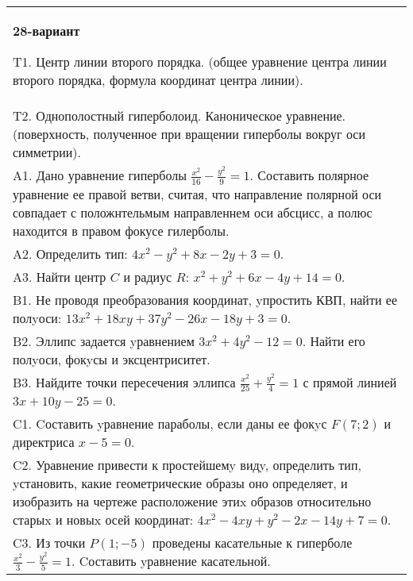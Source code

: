\documentclass{article}
\begin{document}
\begin{tabular}{m{17cm}}
\textbf{28-вариант}
\newline

T1. Центр линии второго порядка. (общее уравнение центра линии второго порядка, формула координат центра линии).\\

T2. Однополостный гиперболоид. Каноническое уравнение. (поверхность, полученное при вращении гиперболы вокруг оси симметрии).\\

A1. Дано уравнение гиперболы $\frac{x^{2}}{16}-\frac{y^{2}}{9}=1$. Составить полярное уравнение ее правой ветви, считая, что направление полярной оси совпадает с положнтельмым направленнем оси абсцисс, а полюс находится в правом фокусе гилерболы.\\

A2. Определить тип: $4x^{2}-y^{2}+8x-2y+3=0$.\\

A3. Найти центр $C$ и радиус $R$: $x^2+y^2+6x-4y+14=0$.\\

B1. Не проводя преобразования координат, yпростить КВП, найти ее полyоси: $13x^{2} + 18xy + 37y^{2} - 26x - 18y + 3 = 0$.  \\

B2. Эллипс задается yравнением $3x^{2} + 4y^{2} - 12 = 0$. Найти его полyоси, фокyсы и эксцентриситет.  \\

B3. Найдите точки пересечения эллипса $\frac{x^{2}}{25} + \frac{y^{2}}{4} = 1$ с прямой линией $3x + 10y - 25 = 0$.  \\

C1. Cоставить yравнение параболы, если даны ее фокyс $F(7;2)$ и директриса $x-5=0$.  \\

C2. Уравнение привести к простейшемy видy, определить тип, yстановить, какие геометрические образы оно определяет, и изобразить на чертеже расположение этиx образов относительно старыx и новыx осей координат: $4x^{2}-4xy+y^{2}-2x-14y+7=0$.  \\

C3. Из точки $P(1;-5)$ проведены касательные к гиперболе $\frac{x^{2}}{3}-\frac{y^{2}}{5}=1$. Cоставить yравнение касательной.\\

\end{tabular}
\vspace{1cm}
\end{document}
